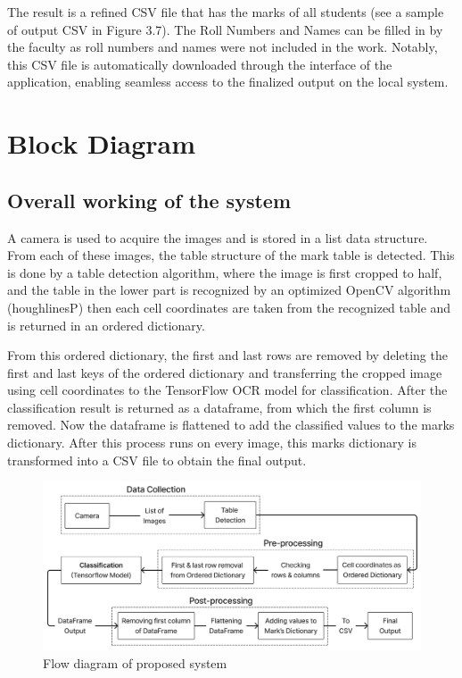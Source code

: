 \noindent The result is a refined CSV file that has the marks of all students (see a sample of output CSV in Figure 3.7). The Roll Numbers and Names can be filled in by the faculty as roll numbers and names were not included in the work. Notably, this CSV file is automatically downloaded through the interface of the application, enabling seamless access to the finalized output on the local system.

\clearpage

\section{Block Diagram}

\subsection{Overall working of the system}

\noindent A camera is used to acquire the images and is stored in a list data structure. From each of these images, the table structure of the mark table is detected. This is done by a table detection algorithm, where the image is first cropped to half, and the table in the lower part is recognized by an optimized OpenCV algorithm (houghlinesP) then each cell coordinates are taken from the recognized table and is returned in an ordered dictionary.\\

\vspace{2 mm}

\noindent From this ordered dictionary, the first and last rows are removed by deleting the first and last keys of the ordered dictionary and transferring the cropped image using cell coordinates to the TensorFlow OCR model for classification. After the classification result is returned as a dataframe, from which the first column is removed. Now the dataframe is flattened to add the classified values to the marks dictionary. After this process runs on every image, this marks dictionary is transformed into a CSV file to obtain the final output.

\vspace{1 cm}

\begin{figure}[h!]
    \centering
    \includegraphics[width=\textwidth]{Images/Block_Diag/Flow_Diagram.jpg}
    \caption{Flow diagram of proposed system}
\end{figure}

